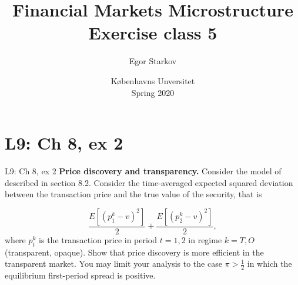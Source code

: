 \documentclass[english,10pt
,aspectratio=169
]{beamer}
\title{Financial Markets Microstructure \\ Exercise class 5}
\author{Egor Starkov}
\date{K{\o}benhavns Unversitet \\
	Spring 2020}
\begin{document}
	
\frame[plain]{\titlepage}
\addtocounter{framenumber}{-1}





\section{L9: Ch 8, ex 2}

\begin{frame}{L9: Ch 8, ex 2}
	\textbf{Price discovery and transparency. }Consider the model of
	 described in section 8.2. Consider the time-averaged
	expected squared deviation between the transaction price and the true value
	of the security, that is
	
	\begin{equation*}
	\frac{E\left[ (p_{1}^{k}-v)^{2}\right] }{2}+\frac{E\left[ (p_{2}^{k}-v)^{2}%
		\right] }{2},
	\end{equation*}%
	where $p_{t}^{k}$ is the transaction price in period $t=1,2$ in regime $%
	k=T,O $ (transparent, opaque). Show that price discovery is more efficient
	in the transparent market. You may limit your analysis to the case $\pi >%
	\frac{1}{2} $ in which the equilibrium first-period spread is positive.
\end{frame}
\end{document}
